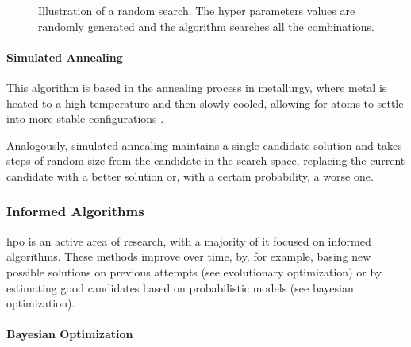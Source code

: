 \begin{figure}[h]
	\centering
    \caption{Illustration of a random search. The hyper parameters values are randomly generated and the algorithm searches all the combinations.}
    \label{random}
 \end{figure}

\paragraph{Simulated Annealing}

This algorithm is based in the annealing process in metallurgy, where metal is heated to a high temperature and then slowly cooled, allowing for atoms to settle into more stable configurations \parencite[p. 128]{kochenderfer2019algorithms}.

Analogously, simulated annealing maintains a single candidate solution and takes steps of random size from the candidate in the search space, replacing the current candidate with a better solution or, with a certain probability, a worse one.

\subsubsection{Informed Algorithms}

\acrshort{hpo} is an active area of research, with a majority of it focused on informed algorithms. These methods improve over time, by, for example, basing new possible solutions on previous attempts (see evolutionary optimization) or by estimating good candidates based on probabilistic models (see bayesian optimization).

\paragraph{Bayesian Optimization}

